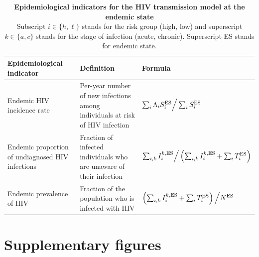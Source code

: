 \documentclass[12pt]{article}
\begin{document}
\begin{table}[H]
	\small
	\centering
	\caption[ Epidemiological indicators for the HIV transmission model at the endemic state]{%
	       	{\bf Epidemiological indicators for the HIV transmission model at the endemic state}\\
	Subscript $i \in \{h,\ell\}$ stands for the risk group (high, low) and superscript $k \in \{a,c\}$ stands for the stage of infection (acute, chronic). Superscript ES stands for endemic state.}
	\begin{tabular}{p{} p{} p{}}
	\toprule
	\bf Epidemiological indicator & \bf Definition & \bf Formula\\
	\midrule
	Endemic HIV incidence rate & {Per-year} number of new infections among individuals at risk of HIV infection & $ \sum_i \Lambda_i S_i^{\rm ES} \Big/ \sum_i S_i^{\rm ES}$\\
	Endemic proportion of undiagnosed HIV infections & Fraction of infected individuals who are unaware of their infection & $\sum_{i,k}I_i^{k,\rm ES} \Big/ \left( \sum_{i,k}I_i^{k,\rm ES} + \sum_i T_i^{\rm ES}\right)$\\ 
	Endemic prevalence of HIV & Fraction of the population who is infected with HIV & $\left(\sum_{i,k}I_i^{k,\rm ES} + \sum_i T_i^{\rm ES}\right) \Big/ N^{\rm ES}$\\
	\bottomrule
	\end{tabular}
	\label{tab:EpiIndFormulas}
\end{table}

\vfill

\newpage
\section{Supplementary figures}
\end{document}
